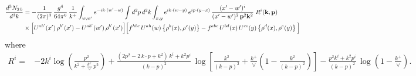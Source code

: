 \documentclass[9pt]{article}
\numberwithin{equation}{section}
\begin{document}
\begin{align}
\frac{d^{3}N_{2\,b}}{d^{3}k} & = -\frac{1}{(2\pi)^{3}}\,\frac{g^{4}}{64\pi^{6}}\,\frac{1}{k^{+}}\int_{w,w'} e^{-ik\cdot(w'-w)}
\int d^{2}p\,d^{2}k\int_{x,y} e^{ik\cdot(w-y)}\,e^{ip\cdot(y-x)}\,\frac{(x'-w')^{i}}{(x'-w')^{2}\,\mathbf{p}^{2}\mathbf{k}^{2}}\;R^{i}(\mathbf{k},\mathbf{p})\notag\\
&\times\Big[U^{ab'}(x')\,\rho^{b'}(x')-U^{ab'}(w')\,\rho^{b'}(x')\Big]
\Big[f^{hbc}\,U^{ah}(w)\left\{\rho^{b}(x),\rho^{c}(y)\right\}-f^{abc}\,U^{bd}(x)\,U^{ce}(y)\left\{\rho^{d}(x),\rho^{e}(y)\right\}\Big]
\end{align}
where
\begin{align}
R^{i} =& -2k^{i}\log\left(\frac{p^{2}}{k^{2}+\frac{k^{+}}{\vee}\,p^{2}}\right)
+\frac{(2p^{2}-2\,k\cdot p+k^{2})\,k^{i}+k^{2}p^{i}}{(k-p)^{2}}\,
\log\left[\frac{k^{2}}{(k-p)^{2}}+\frac{k^{+}}{\vee}\left(1-\frac{k^{2}}{(k-p)^{2}}\right)\right]
-\frac{p^{2}k^{i}+k^{2}p^{i}}{(k-p)^{2}}\,\log\left(1-\frac{k^{+}}{\vee}\right).
\end{align}
\end{document}
